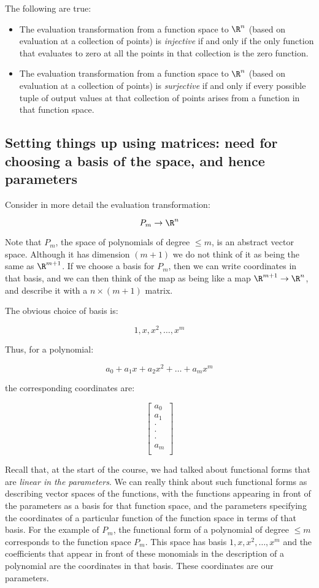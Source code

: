\documentclass[10pt]{amsart}
\begin{document}
The following are true:

\begin{itemize}
\item The evaluation transformation from a function space to $\R^n$
  (based on evaluation at a collection of points) is {\em injective}
  if and only if the only function that evaluates to zero at all the
  points in that collection is the zero function.
\item The evaluation transformation from a function space to $\R^n$
  (based on evaluation at a collection of points) is {\em surjective}
  if and only if every possible tuple of output values at that
  collection of points arises from a function in that function space.
\end{itemize}

\subsection{Setting things up using matrices: need for choosing a basis of the space, and hence parameters}

Consider in more detail the evaluation transformation:

$$P_m \to \R^n$$

Note that $P_m$, the space of polynomials of degree $\le m$, is an
abstract vector space. Although it has dimension $(m + 1)$ we do not
think of it as being the same as $\R^{m+1}$. If we choose a basis for
$P_m$, then we can write coordinates in that basis, and we can then
think of the map as being like a map $\R^{m+1} \to \R^n$, and describe
it with a $n \times (m + 1)$ matrix.

The obvious choice of basis is:

$$1,x,x^2,\dots,x^m$$

Thus, for a polynomial:

$$a_0 + a_1x + a_2x^2 + \dots  + a_mx^m$$

the corresponding coordinates are:

$$\left[\begin{matrix} a_0 \\ a_1 \\ \cdot \\ \cdot \\ \cdot \\ a_m \\\end{matrix}\right]$$

Recall that, at the start of the course, we had talked about
functional forms that are {\em linear in the parameters}. We can
really think about such functional forms as describing vector spaces
of the functions, with the functions appearing in front of the
parameters as a basis for that function space, and the parameters
specifying the coordinates of a particular function of the function
space in terms of that basis. For the example of $P_m$, the functional
form of a polynomial of degree $\le m$ corresponds to the function
space $P_m$. This space has basis $1,x,x^2,\dots,x^m$ and the
coefficients that appear in front of these monomials in the
description of a polynomial are the coordinates in that basis. These
coordinates are our parameters.
\end{document}
